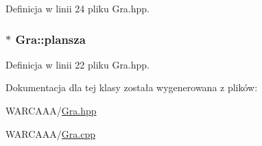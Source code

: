 Definicja w linii 24 pliku Gra.\-hpp.

\hypertarget{class_gra_af25b66fe6edb17dbc849130c9baf6353}{
\subsubsection[{plansza}]{$\ast$ Gra\-::plansza}}\label{class_gra_af25b66fe6edb17dbc849130c9baf6353}


Definicja w linii 22 pliku Gra.\-hpp.



Dokumentacja dla tej klasy została wygenerowana z plików\-:\begin{DoxyCompactItemize}
\item 
W\-A\-R\-C\-A\-A\-A/\hyperlink{_gra_8hpp}{Gra.\-hpp}\item 
W\-A\-R\-C\-A\-A\-A/\hyperlink{_gra_8cpp}{Gra.\-cpp}\end{DoxyCompactItemize}
